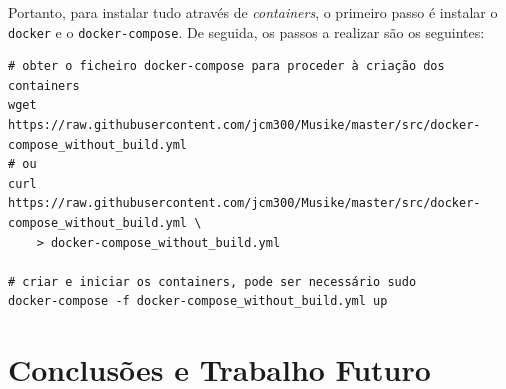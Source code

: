\documentclass{article}
\begin{document}
Portanto, para instalar tudo através de \textit{containers}, o primeiro passo é instalar o \texttt{docker} e o \texttt{docker-compose}. De seguida, os passos a realizar são os seguintes:

\small
\begin{framed}
\begin{verbatim}
# obter o ficheiro docker-compose para proceder à criação dos containers
wget https://raw.githubusercontent.com/jcm300/Musike/master/src/docker-compose_without_build.yml
# ou
curl https://raw.githubusercontent.com/jcm300/Musike/master/src/docker-compose_without_build.yml \ 
    > docker-compose_without_build.yml

# criar e iniciar os containers, pode ser necessário sudo
docker-compose -f docker-compose_without_build.yml up
\end{verbatim}
\end{framed}
\normalsize

\section{Conclusões e Trabalho Futuro}


\newpage 
\printbibliography

\begin{appendices}

\end{appendices}
\end{document}
